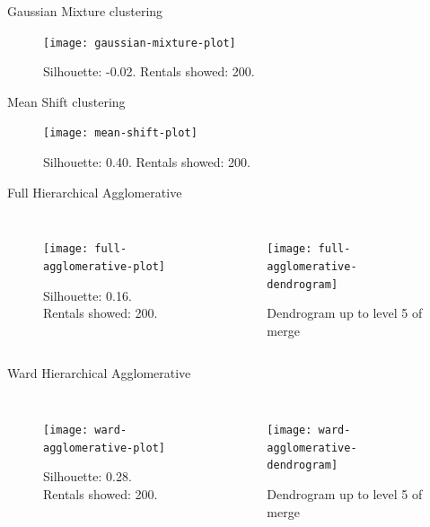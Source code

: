 \documentclass{beamer}
\begin{document}
\begin{frame}{Gaussian Mixture clustering}
\begin{figure}[bt]
	\centering
	\texttt{[image: gaussian-mixture-plot]}
	\caption{Silhouette: -0.02. Rentals showed: 200.}
	\label{fig:gaussian-mixture-line}
\end{figure}
\end{frame}

\begin{frame}{Mean Shift clustering}
\begin{figure}[bt]
	\centering
	\texttt{[image: mean-shift-plot]}
	\caption{Silhouette: 0.40. Rentals showed: 200.}
	\label{fig:mean-shift-line}
\end{figure}
\end{frame}

\begin{frame}{Full Hierarchical Agglomerative}
\begin{columns}[t, onlytextwidth]
	\begin{figure}[bt]
		\centering
		\texttt{[image: full-agglomerative-plot]}
		\caption{Silhouette: 0.16. Rentals showed: 200.}
		\label{fig:full-agglomerative-line}
	\end{figure}
	\begin{figure}[bt]
		\centering
		\texttt{[image: full-agglomerative-dendrogram]}
		\caption{Dendrogram up to level 5 of merge}
		\label{fig:full-agglomerative-dendrogram}
	\end{figure}
\end{columns}
\end{frame}

\begin{frame}{Ward Hierarchical Agglomerative}
\begin{columns}[t, onlytextwidth]
	\begin{figure}[bt]
		\centering
		\texttt{[image: ward-agglomerative-plot]}
		\caption{Silhouette: 0.28. Rentals showed: 200.}
		\label{fig:ward-agglomerative-line}
	\end{figure}
	\begin{figure}[bt]
		\centering
		\texttt{[image: ward-agglomerative-dendrogram]}
		\caption{Dendrogram up to level 5 of merge}
		\label{fig:ward-agglomerative-dendrogram}
	\end{figure}
\end{columns}
\end{frame}
\end{document}

